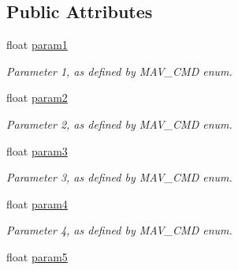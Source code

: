 \subsection*{Public Attributes}
\begin{DoxyCompactItemize}
\item 
\hypertarget{struct____mavlink__command__long__t_a8bb82d921422fd825276bbc43502fc77}{float \hyperlink{struct____mavlink__command__long__t_a8bb82d921422fd825276bbc43502fc77}{param1}}\label{struct____mavlink__command__long__t_a8bb82d921422fd825276bbc43502fc77}

\begin{DoxyCompactList}\small\item\em Parameter 1, as defined by M\+A\+V\+\_\+\+C\+M\+D enum. \end{DoxyCompactList}\item 
\hypertarget{struct____mavlink__command__long__t_a715bfae8c34e8882b82efbb2bd0e580c}{float \hyperlink{struct____mavlink__command__long__t_a715bfae8c34e8882b82efbb2bd0e580c}{param2}}\label{struct____mavlink__command__long__t_a715bfae8c34e8882b82efbb2bd0e580c}

\begin{DoxyCompactList}\small\item\em Parameter 2, as defined by M\+A\+V\+\_\+\+C\+M\+D enum. \end{DoxyCompactList}\item 
\hypertarget{struct____mavlink__command__long__t_a9b11618cd6d409944727cfcc0d637f72}{float \hyperlink{struct____mavlink__command__long__t_a9b11618cd6d409944727cfcc0d637f72}{param3}}\label{struct____mavlink__command__long__t_a9b11618cd6d409944727cfcc0d637f72}

\begin{DoxyCompactList}\small\item\em Parameter 3, as defined by M\+A\+V\+\_\+\+C\+M\+D enum. \end{DoxyCompactList}\item 
\hypertarget{struct____mavlink__command__long__t_a1448f543670b7a8973c6461254cce429}{float \hyperlink{struct____mavlink__command__long__t_a1448f543670b7a8973c6461254cce429}{param4}}\label{struct____mavlink__command__long__t_a1448f543670b7a8973c6461254cce429}

\begin{DoxyCompactList}\small\item\em Parameter 4, as defined by M\+A\+V\+\_\+\+C\+M\+D enum. \end{DoxyCompactList}\item 
\hypertarget{struct____mavlink__command__long__t_a9c74f309b82fed5527bf1e7732424f21}{float \hyperlink{struct____mavlink__command__long__t_a9c74f309b82fed5527bf1e7732424f21}{param5}}\label{struct____mavlink__command__long__t_a9c74f309b82fed5527bf1e7732424f21}


\end{DoxyCompactItemize}
